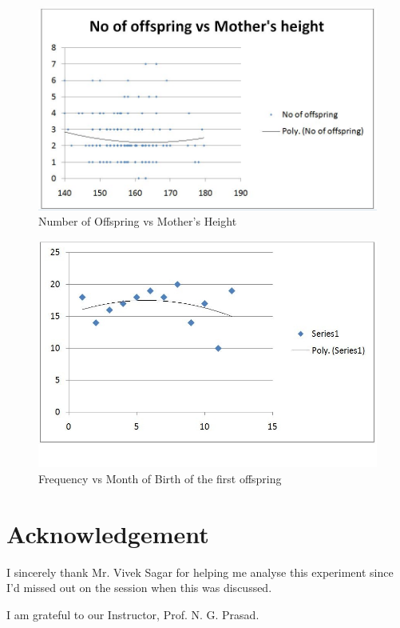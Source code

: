 \begin{figure}[bth]
	\begin{center}
		\includegraphics[width=1.1\linewidth]{gfx/Fitness_mother}
	\end{center}
\caption[Number of Offspring vs Mother's Height]{Number of Offspring vs Mother's Height}
\label{human_mother}
\end{figure}

\begin{figure}[bth]
	\begin{center}
		\includegraphics[width=1.1\linewidth]{gfx/Monthofbirth_first_offspring}
	\end{center}
\caption[Frequency vs Month of Birth of the first offspring]{Frequency vs Month of Birth of the first offspring}
\label{human_last}
\end{figure}

\section{Acknowledgement}
	I sincerely thank Mr. Vivek Sagar for helping me analyse this experiment since I'd missed out on the session when this was discussed.
	\par
	I am grateful to our Instructor, Prof. N. G. Prasad.